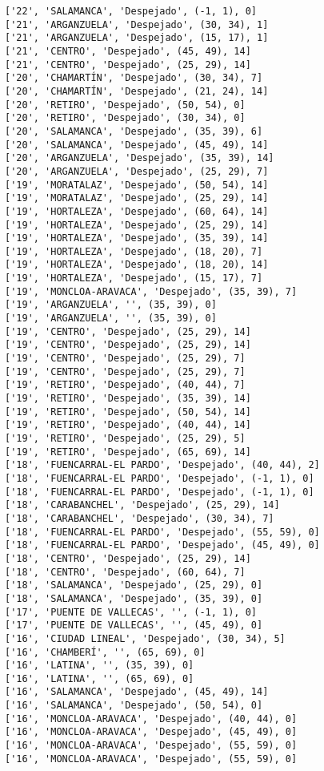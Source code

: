 \documentclass[11pt]{article}
\begin{document}
\begin{Verbatim}[commandchars=\\\{\}]
['22', 'SALAMANCA', 'Despejado', (-1, 1), 0]
['21', 'ARGANZUELA', 'Despejado', (30, 34), 1]
['21', 'ARGANZUELA', 'Despejado', (15, 17), 1]
['21', 'CENTRO', 'Despejado', (45, 49), 14]
['21', 'CENTRO', 'Despejado', (25, 29), 14]
['20', 'CHAMARTÍN', 'Despejado', (30, 34), 7]
['20', 'CHAMARTÍN', 'Despejado', (21, 24), 14]
['20', 'RETIRO', 'Despejado', (50, 54), 0]
['20', 'RETIRO', 'Despejado', (30, 34), 0]
['20', 'SALAMANCA', 'Despejado', (35, 39), 6]
['20', 'SALAMANCA', 'Despejado', (45, 49), 14]
['20', 'ARGANZUELA', 'Despejado', (35, 39), 14]
['20', 'ARGANZUELA', 'Despejado', (25, 29), 7]
['19', 'MORATALAZ', 'Despejado', (50, 54), 14]
['19', 'MORATALAZ', 'Despejado', (25, 29), 14]
['19', 'HORTALEZA', 'Despejado', (60, 64), 14]
['19', 'HORTALEZA', 'Despejado', (25, 29), 14]
['19', 'HORTALEZA', 'Despejado', (35, 39), 14]
['19', 'HORTALEZA', 'Despejado', (18, 20), 7]
['19', 'HORTALEZA', 'Despejado', (18, 20), 14]
['19', 'HORTALEZA', 'Despejado', (15, 17), 7]
['19', 'MONCLOA-ARAVACA', 'Despejado', (35, 39), 7]
['19', 'ARGANZUELA', '', (35, 39), 0]
['19', 'ARGANZUELA', '', (35, 39), 0]
['19', 'CENTRO', 'Despejado', (25, 29), 14]
['19', 'CENTRO', 'Despejado', (25, 29), 14]
['19', 'CENTRO', 'Despejado', (25, 29), 7]
['19', 'CENTRO', 'Despejado', (25, 29), 7]
['19', 'RETIRO', 'Despejado', (40, 44), 7]
['19', 'RETIRO', 'Despejado', (35, 39), 14]
['19', 'RETIRO', 'Despejado', (50, 54), 14]
['19', 'RETIRO', 'Despejado', (40, 44), 14]
['19', 'RETIRO', 'Despejado', (25, 29), 5]
['19', 'RETIRO', 'Despejado', (65, 69), 14]
['18', 'FUENCARRAL-EL PARDO', 'Despejado', (40, 44), 2]
['18', 'FUENCARRAL-EL PARDO', 'Despejado', (-1, 1), 0]
['18', 'FUENCARRAL-EL PARDO', 'Despejado', (-1, 1), 0]
['18', 'CARABANCHEL', 'Despejado', (25, 29), 14]
['18', 'CARABANCHEL', 'Despejado', (30, 34), 7]
['18', 'FUENCARRAL-EL PARDO', 'Despejado', (55, 59), 0]
['18', 'FUENCARRAL-EL PARDO', 'Despejado', (45, 49), 0]
['18', 'CENTRO', 'Despejado', (25, 29), 14]
['18', 'CENTRO', 'Despejado', (60, 64), 7]
['18', 'SALAMANCA', 'Despejado', (25, 29), 0]
['18', 'SALAMANCA', 'Despejado', (35, 39), 0]
['17', 'PUENTE DE VALLECAS', '', (-1, 1), 0]
['17', 'PUENTE DE VALLECAS', '', (45, 49), 0]
['16', 'CIUDAD LINEAL', 'Despejado', (30, 34), 5]
['16', 'CHAMBERÍ', '', (65, 69), 0]
['16', 'LATINA', '', (35, 39), 0]
['16', 'LATINA', '', (65, 69), 0]
['16', 'SALAMANCA', 'Despejado', (45, 49), 14]
['16', 'SALAMANCA', 'Despejado', (50, 54), 0]
['16', 'MONCLOA-ARAVACA', 'Despejado', (40, 44), 0]
['16', 'MONCLOA-ARAVACA', 'Despejado', (45, 49), 0]
['16', 'MONCLOA-ARAVACA', 'Despejado', (55, 59), 0]
['16', 'MONCLOA-ARAVACA', 'Despejado', (55, 59), 0]

\end{Verbatim}
\end{document}

